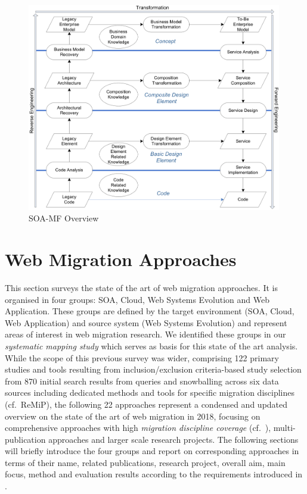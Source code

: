 \begin{figure}
\hypertarget{fig:soa-mf}{%
\centering
\includegraphics[width=0.99\textwidth]{../figures/soa-mf.png}
\caption{SOA-MF Overview \autocite{Razavian2010}}\label{fig:soa-mf}
}
\end{figure}

\hypertarget{sec:approaches}{%
\section{Web Migration Approaches}\label{sec:approaches}}

This section surveys the state of the art of web migration approaches.
It is organised in four groups: SOA, Cloud, Web Systems Evolution and Web Application.
These groups are defined by the target environment (SOA, Cloud, Web Application) and source system (Web Systems Evolution) and represent areas of interest in web migration research.
We identified these groups in our \emph{systematic mapping study} \autocite{Heil2017Survey} which serves as basis for this state of the art analysis.
While the scope of this previous survey was wider, comprising 122 primary studies and tools resulting from inclusion/exclusion criteria-based study selection from 870 initial search results from queries and snowballing across six data sources including dedicated methods and tools for specific migration disciplines (cf.~ReMiP), the following 22 approaches represent a condensed and updated overview on the state of the art of web migration in 2018, focusing on comprehensive approaches with high \emph{migration discipline coverage} (cf.~\autocite{Heil2017Survey}), multi-publication approaches and larger scale research projects.
The following sections will briefly introduce the four groups and report on corresponding approaches in terms of their name, related publications, research project, overall aim, main focus, method and evaluation results according to the requirements introduced in .

